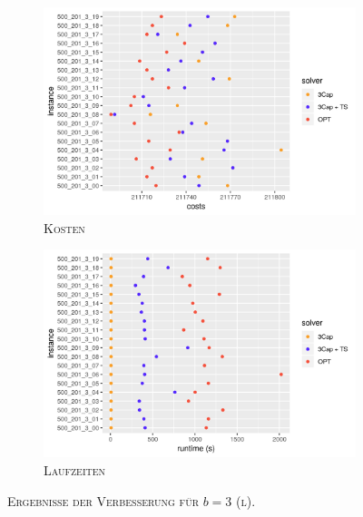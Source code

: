 \begin{figure}[H]
\centering
\begin{subfigure}[b]{0.47\textwidth}
\includegraphics[width=1.1\textwidth]{img/imp_b=3_l_costs.png}
\caption{\textsc{Kosten}}
\label{fig:imp_b=3_l_costs}
\end{subfigure}
\hfill
\begin{subfigure}[b]{0.47\textwidth}
\includegraphics[width=1.1\textwidth]{img/imp_b=3_l_runtimes.png}
\caption{\textsc{Laufzeiten}}
\label{fig:imp_b=3_l_runtimes}
\end{subfigure}
\caption{\textsc{Ergebnisse der Verbesserung für $b = 3$ (l)}.}
\label{fig:imp_res_b=3_l}
\end{figure}


